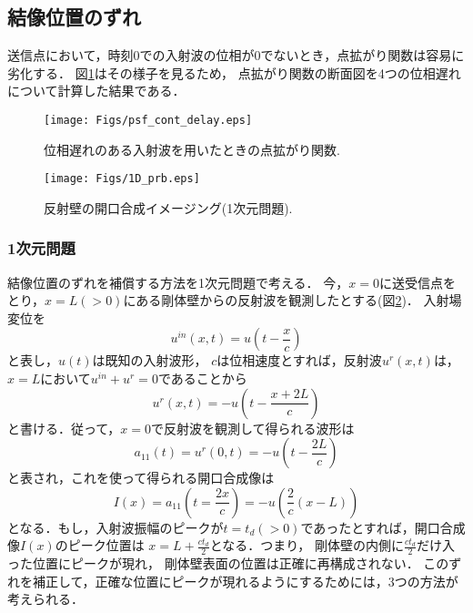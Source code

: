 \subsection{結像位置のずれ}
送信点において，時刻0での入射波の位相が0でないとき，点拡がり関数は容易に劣化する．
図\ref{fig:XXX_psf_cont_delay}はその様子を見るため，
点拡がり関数の断面図を4つの位相遅れについて計算した結果である．
\begin{figure}[h]
	\begin{center}
	\texttt{[image: Figs/psf\_cont\_delay.eps]} 
	\end{center}
	\caption{位相遅れのある入射波を用いたときの点拡がり関数.} 
	\label{fig:XXX_psf_cont_delay}
\end{figure}
\begin{figure}[h]
	\begin{center}
	\texttt{[image: Figs/1D\_prb.eps]} 
	\end{center}
	\caption{反射壁の開口合成イメージング(1次元問題).} 
	\label{fig:XXX_1D_prb}
\end{figure}
\subsubsection{1次元問題}
結像位置のずれを補償する方法を1次元問題で考える．
今，$x=0$に送受信点をとり，$x=L(>0)$にある剛体壁からの反射波を観測したとする(図\ref{fig:XXX_1D_prb})．
入射場変位を
\begin{equation}
	u^{in}(x,t)=u\left(t-\frac{x}{c}\right)
	\label{eqn:XXX_uin_1D}
\end{equation}
と表し，$u(t)$は既知の入射波形，
$c$は位相速度とすれば，反射波$u^{r}(x,t)$は，$x=L$において$u^{in}+u^{r}=0$であることから
\begin{equation}
	u^{r}(x,t)=-u\left(t-\frac{x+2L}{c}\right)
	\label{eqn:XXX_ur_1D}
\end{equation}
と書ける．従って，$x=0$で反射波を観測して得られる波形は
\begin{equation}
	a_{11}(t)=u^{r}(0,t)=-u\left( t-\frac{2L}{c}\right)
	\label{eqn:XXX_12}
\end{equation}
と表され，これを使って得られる開口合成像は
\begin{equation}
	I(x)=
	a_{11}\left(t=\frac{2x}{c}\right)
	=
	-u\left(\frac{2}{c}(x-L)\right)
	\label{eqn:XXX_13}
\end{equation}
となる．もし，入射波振幅のピークが$t=t_d(>0)$であったとすれば，開口合成像$I(x)$のピーク位置は
$x=L+\frac{ct_d}{2}$となる．つまり，
剛体壁の内側に$\frac{ct_d}{2}$だけ入った位置にピークが現れ，
剛体壁表面の位置は正確に再構成されない．
このずれを補正して，正確な位置にピークが現れるようにするためには，3つの方法が考えられる．
